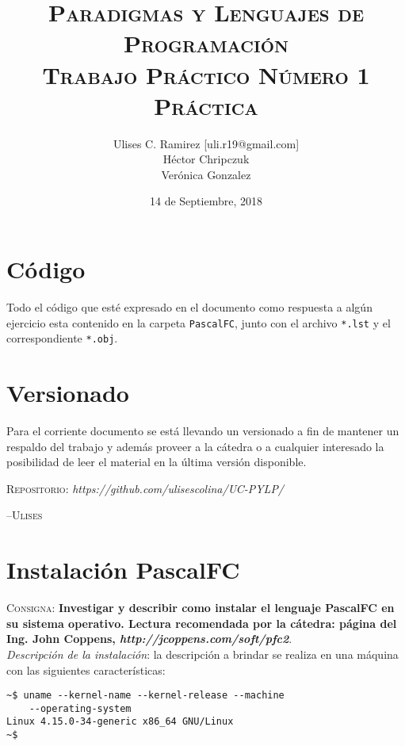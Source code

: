 \documentclass{article}
\title{\textsc{Paradigmas y Lenguajes de Programaci\'on\\Trabajo Pr\'actico N\'umero 1\\Pr\'actica}}
\author{Ulises C. Ramirez [uli.r19@gmail.com]\\H\'ector Chripczuk\\Ver\'onica Gonzalez}
\date{14 de Septiembre, 2018}
\begin{document}
\maketitle
{}
\newpage

\section*{C\'odigo}
Todo el c\'odigo que est\'e expresado en el documento como respuesta a alg\'un ejercicio esta contenido en la carpeta \texttt{PascalFC}, junto con el archivo \texttt{*.lst} y el correspondiente \texttt{*.obj}.\\

\section*{Versionado}
Para el corriente documento se est\'a llevando un versionado a fin de mantener un respaldo del trabajo y adem\'as proveer a la c\'atedra o a cualquier interesado la posibilidad de leer el material en la \'ultima versi\'on disponible.\\

\begin{center}
  \textsc{Repositorio}: \textit{https://github.com/ulisescolina/UC-PYLP/}
\end{center}

\hfill--\textsc{Ulises}
\tableofcontents
{}
\newpage

\section{Instalaci\'on PascalFC}
\label{sec:pascalfc}
\textsc{Consigna}: \textbf{Investigar y describir como instalar el lenguaje PascalFC en su sistema operativo. Lectura recomendada por la c\'atedra: p\'agina del Ing. John Coppens, \textit{http://jcoppens.com/soft/pfc2}}.\\

\textit{Descripci\'on de la instalaci\'on}: la descripci\'on a brindar se realiza en una m\'aquina con las siguientes caracter\'isticas:\\

\begin{lstlisting}[caption={Caracter\'isticas sistema}]
~$ uname --kernel-name --kernel-release --machine
    --operating-system
Linux 4.15.0-34-generic x86_64 GNU/Linux
~$
\end{lstlisting}
\end{document}
